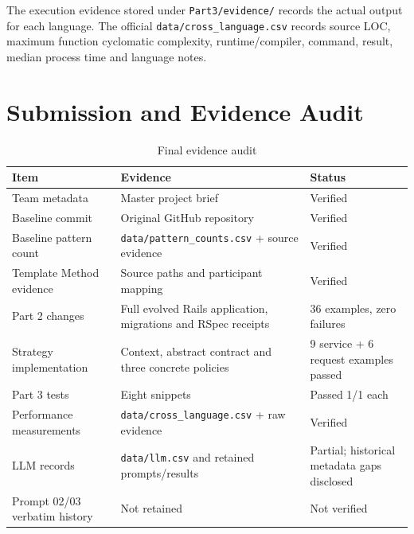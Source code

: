 \documentclass[10pt,a4paper]{article}
\newcommand{\code}[1]{\texttt{\small #1}}
\begin{document}
The execution evidence stored under \code{Part3/evidence/} records the actual output for each language. The official \code{data/cross\_language.csv} records source LOC, maximum function cyclomatic complexity, runtime/compiler, command, result, median process time and language notes.

\section{Submission and Evidence Audit}

\begin{table}[H]
\centering
\caption{Final evidence audit}
\label{tab:audit}
\begin{tabularx}{\linewidth}{lXl}
\toprule
Item & Evidence & Status\\
\midrule
Team metadata & Master project brief & Verified\\
Baseline commit & Original GitHub repository & Verified\\
Baseline pattern count & \code{data/pattern\_counts.csv} + source evidence & Verified\\
Template Method evidence & Source paths and participant mapping & Verified\\
Part 2 changes & Full evolved Rails application, migrations and RSpec receipts & 36 examples, zero failures\\
Strategy implementation & Context, abstract contract and three concrete policies & 9 service + 6 request examples passed\\
Part 3 tests & Eight snippets & Passed 1/1 each\\
Performance measurements & \code{data/cross\_language.csv} + raw evidence & Verified\\
LLM records & \code{data/llm.csv} and retained prompts/results & Partial; historical metadata gaps disclosed\\
Prompt 02/03 verbatim history & Not retained & Not verified\\
\bottomrule
\end{tabularx}
\end{table}
\end{document}

